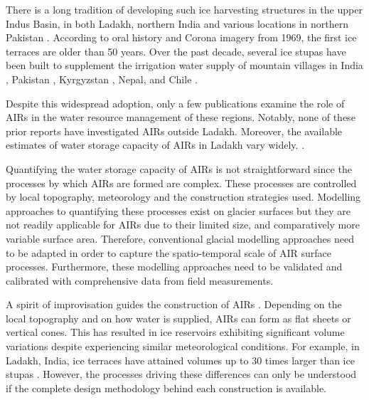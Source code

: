 There is a long tradition of developing such ice harvesting structures in the upper Indus Basin, in both Ladakh,
northern India \citep{labbalTraditionalOasesLadakh2000, nusserIrrigationDevelopmentUpper2012} and various
locations in northern Pakistan \citep{kreutzmannScarcityOpulenceWater2011}. According to oral history and Corona
imagery from 1969, the first ice terraces are older than 50 years. Over the past decade, several ice stupas have
been built to supplement the irrigation water supply of mountain villages in India
\citep{wangchukIceStupaCompetition2020, palmerStoringFrozenWater2022, aggarwalAdaptationClimateChange2021},
Pakistan \citep{awazproductionIceStupaArtificial2022}, Kyrgyzstan \citep{bbcnewsBrightArtificialGlacier2020},
Nepal, and Chile \citep{reutersConservationistsChileAim2021}.

Despite this widespread adoption, only a few publications examine the role of \ac{AIRs} in the water resource
management of these regions. Notably, none of these prior reports have investigated \ac{AIRs} outside Ladakh.
Moreover, the available estimates of water storage capacity of \ac{AIRs} in Ladakh vary widely.
\citep{norphelSnowWaterHarvesting2015, baglaArtificialGlaciersHelp1998}.

Quantifying the water storage capacity of \ac{AIRs} is not straightforward since the processes by which \ac{AIRs} are
formed are complex. These processes are controlled by local topography, meteorology and the construction
strategies used. Modelling approaches to quantifying these processes exist on glacier surfaces but they are not
readily applicable for \ac{AIRs} due to their limited size, and comparatively more variable surface area. Therefore,
conventional glacial modelling approaches need to be adapted in order to capture the
spatio-temporal scale of AIR surface processes. Furthermore, these modelling approaches need to be validated and
calibrated with comprehensive data from field measurements. 

A spirit of improvisation guides the construction of \ac{AIRs} \citep{clouseLadakhArtificialGlaciers2017}.
Depending on the local topography and on how water is supplied, \ac{AIRs} can form as flat sheets
or vertical cones. This has resulted in ice reservoirs exhibiting significant volume variations despite
experiencing similar meteorological conditions. For example, in Ladakh, India, ice terraces have attained volumes up to 30 times
larger than ice stupas \citep{nusserSociohydrologyArtificialGlaciers2019}. However, the
processes driving these differences can only be understood if the complete design methodology behind each construction is available.

